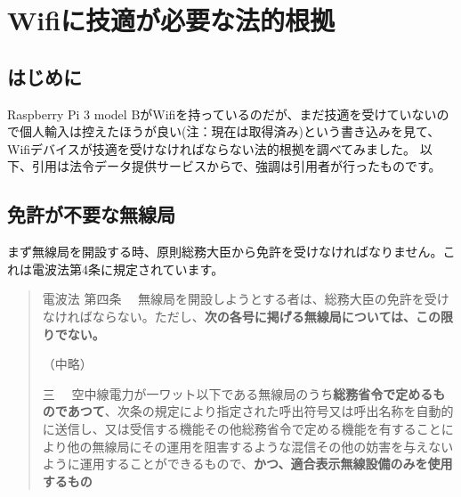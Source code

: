 \chapter*{Wifiに技適が必要な法的根拠}

\section*{はじめに}
Raspberry Pi 3 model BがWifiを持っているのだが、まだ技適を受けていないので個人輸入は控えたほうが良い(注：現在は取得済み)という書き込みを見て、Wifiデバイスが技適を受けなければならない法的根拠を調べてみました。 以下、引用は法令データ提供サービスからで、強調は引用者が行ったものです。

\section*{免許が不要な無線局}

まず無線局を開設する時、原則総務大臣から免許を受けなければなりません。これは電波法第4条に規定されています。
\begin{quotation}
    電波法 第四条 　無線局を開設しようとする者は、総務大臣の免許を受けなければならない。ただし、\textbf{次の各号に掲げる無線局については、この限りでない。}

    （中略）

    三 　空中線電力が一ワット以下である無線局のうち\textbf{総務省令で定めるものであつて}、次条の規定により指定された呼出符号又は呼出名称を自動的に送信し、又は受信する機能その他総務省令で定める機能を有することにより他の無線局にその運用を阻害するような混信その他の妨害を与えないように運用することができるもので、\textbf{かつ、適合表示無線設備のみを使用するもの}
\end{quotation}

